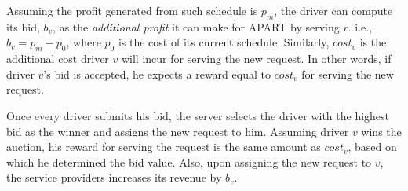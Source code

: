 Assuming the profit generated from such schedule is $p_m$, the driver can compute its bid, $b_v$, as the \textit{additional profit} it can make for APART by serving $r$. i.e., $b_v = p_m - p_0$, where $p_0$ is the cost of its current schedule. Similarly, $cost_v$ is the additional cost driver $v$ will incur for serving the new request. In other words, if driver $v$'s bid is accepted, he expects a reward equal to $cost_v$ for serving the new request.

Once every driver submits his bid, the server selects the driver with the highest bid as the winner and assigns the new request to him. Assuming driver $v$ wins the auction, his reward for serving the request is the same amount as $cost_v$, based on which he determined the bid value. Also, upon assigning the new request to $v$, the service providers increases its revenue by $b_v$.






